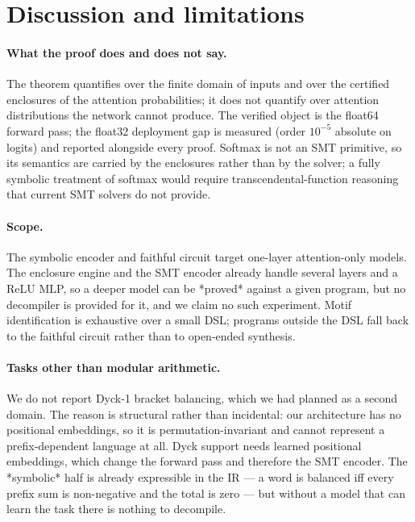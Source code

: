 \documentclass[11pt]{article}
\begin{document}
\section{Discussion and limitations}
\label{sec:discussion}

\paragraph{What the proof does and does not say.}
The theorem quantifies over the finite domain of inputs and over the certified
enclosures of the attention probabilities; it does not quantify over attention
distributions the network cannot produce. The verified object is the float64
forward pass; the float32 deployment gap is measured (order $10^{-5}$ absolute on
logits) and reported alongside every proof. Softmax is not an SMT primitive, so
its semantics are carried by the enclosures rather than by the solver; a fully
symbolic treatment of softmax would require transcendental-function reasoning
that current SMT solvers do not provide.

\paragraph{Scope.}
The symbolic encoder and faithful circuit target one-layer attention-only
models. The enclosure engine and the SMT encoder already handle several layers
and a ReLU MLP, so a deeper model can be *proved* against a given program, but
no decompiler is provided for it, and we claim no such experiment. Motif
identification is exhaustive over a small DSL; programs outside the DSL fall
back to the faithful circuit rather than to open-ended synthesis.

\paragraph{Tasks other than modular arithmetic.}
We do not report Dyck-1 bracket balancing, which we had planned as a second
domain. The reason is structural rather than incidental: our architecture has no
positional embeddings, so it is permutation-invariant and cannot represent a
prefix-dependent language at all. Dyck support needs learned positional
embeddings, which change the forward pass and therefore the SMT encoder. The
*symbolic* half is already expressible in the IR --- a word is balanced iff
every prefix sum is non-negative and the total is zero --- but without a model
that can learn the task there is nothing to decompile.
\end{document}
